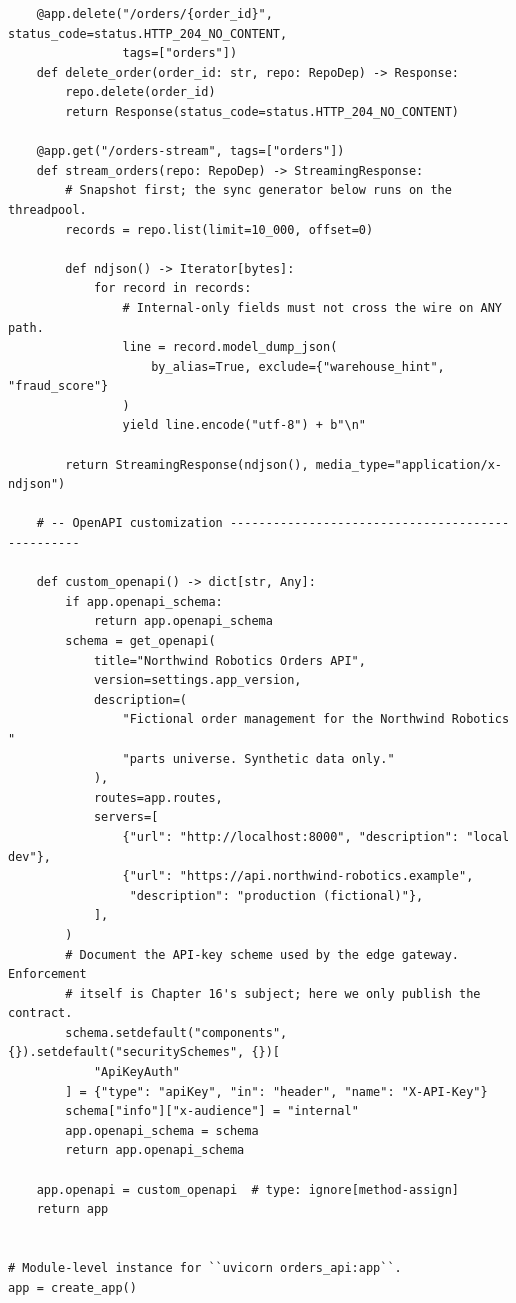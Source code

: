 \begin{verbatim}
    @app.delete("/orders/{order_id}", status_code=status.HTTP_204_NO_CONTENT,
                tags=["orders"])
    def delete_order(order_id: str, repo: RepoDep) -> Response:
        repo.delete(order_id)
        return Response(status_code=status.HTTP_204_NO_CONTENT)

    @app.get("/orders-stream", tags=["orders"])
    def stream_orders(repo: RepoDep) -> StreamingResponse:
        # Snapshot first; the sync generator below runs on the threadpool.
        records = repo.list(limit=10_000, offset=0)

        def ndjson() -> Iterator[bytes]:
            for record in records:
                # Internal-only fields must not cross the wire on ANY path.
                line = record.model_dump_json(
                    by_alias=True, exclude={"warehouse_hint", "fraud_score"}
                )
                yield line.encode("utf-8") + b"\n"

        return StreamingResponse(ndjson(), media_type="application/x-ndjson")

    # -- OpenAPI customization -------------------------------------------------

    def custom_openapi() -> dict[str, Any]:
        if app.openapi_schema:
            return app.openapi_schema
        schema = get_openapi(
            title="Northwind Robotics Orders API",
            version=settings.app_version,
            description=(
                "Fictional order management for the Northwind Robotics "
                "parts universe. Synthetic data only."
            ),
            routes=app.routes,
            servers=[
                {"url": "http://localhost:8000", "description": "local dev"},
                {"url": "https://api.northwind-robotics.example",
                 "description": "production (fictional)"},
            ],
        )
        # Document the API-key scheme used by the edge gateway. Enforcement
        # itself is Chapter 16's subject; here we only publish the contract.
        schema.setdefault("components", {}).setdefault("securitySchemes", {})[
            "ApiKeyAuth"
        ] = {"type": "apiKey", "in": "header", "name": "X-API-Key"}
        schema["info"]["x-audience"] = "internal"
        app.openapi_schema = schema
        return app.openapi_schema

    app.openapi = custom_openapi  # type: ignore[method-assign]
    return app


# Module-level instance for ``uvicorn orders_api:app``.
app = create_app()
\end{verbatim}


